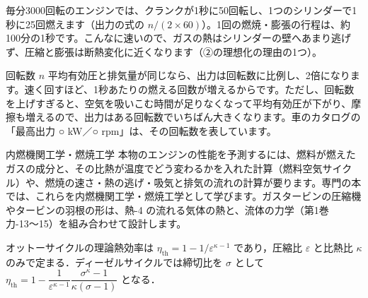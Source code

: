 \begin{phmijika}[1秒に何回燃える？]
毎分3000回転のエンジンでは、クランクが1秒に50回転し、1つのシリンダーで1秒に25回燃えます（出力の式の $n/(2\times60)$）。1回の燃焼・膨張の行程は、約100分の1秒です。こんなに速いので、ガスの熱はシリンダーの壁へあまり逃げず、圧縮と膨張は断熱変化に近くなります（②の理想化の理由の1つ）。
\end{phmijika}

\begin{phbaisuru}{回転数 $n$}
平均有効圧と排気量が同じなら、出力は回転数に比例し、2倍になります。速く回すほど、1秒あたりの燃える回数が増えるからです。ただし、回転数を上げすぎると、空気を吸いこむ時間が足りなくなって平均有効圧が下がり、摩擦も増えるので、出力はある回転数でいちばん大きくなります。車のカタログの「最高出力 ○ kW／○ rpm」は、その回転数を表しています。
\end{phbaisuru}

\begin{phsaki}{内燃機関工学・燃焼工学}
本物のエンジンの性能を予測するには、燃料が燃えたガスの成分と、その比熱が温度でどう変わるかを入れた計算（燃料空気サイクル）や、燃焼の速さ・熱の逃げ・吸気と排気の流れの計算が要ります。専門の本では、これらを内燃機関工学・燃焼工学として学びます。ガスタービンの圧縮機やタービンの羽根の形は、熱-4 の流れる気体の熱と、流体の力学（第1巻 力-13〜15）を組み合わせて設計します。
\end{phsaki}

\begin{senmonsho}[機械の熱力学の本の書き方]
\begin{bkhonbun}
オットーサイクルの理論熱効率は $\eta_{\mathrm{th}}=1-1/\varepsilon^{\kappa-1}$ であり，圧縮比 $\varepsilon$ と比熱比 $\kappa$ のみで定まる．ディーゼルサイクルでは締切比を $\sigma$ として $\eta_{\mathrm{th}}=1-\dfrac{1}{\varepsilon^{\kappa-1}}\dfrac{\sigma^{\kappa}-1}{\kappa(\sigma-1)}$ となる．
\end{bkhonbun}
\end{senmonsho}

